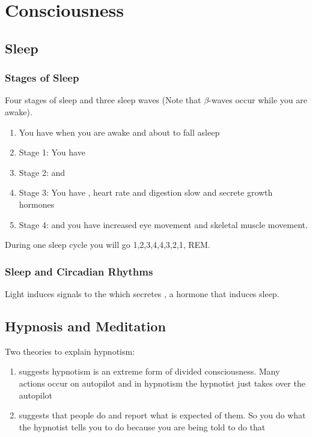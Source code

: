\documentclass[../Psych_Soci_review.tex]{subfiles}
\begin{document}
\section{Consciousness}
\subsection{Sleep}
\subsubsection{Stages of Sleep}
Four stages of sleep and three sleep waves (Note that $ \beta $-waves occur
while you are awake).
\begin{enumerate}
  \item You have when  you are awake and about to fall
    asleep  
  \item Stage 1: You have 
  \item Stage 2:  and 
  \item Stage 3: You have , heart rate and digestion slow
    and secrete growth hormones
  \item Stage 4:  and you have increased eye movement and
    skeletal muscle movement.
\end{enumerate}
During one sleep cycle you will go 1,2,3,4,4,3,2,1, REM. 

\subsubsection{Sleep and Circadian Rhythms}
Light induces signals to the  which secretes
, a hormone that induces sleep.

\subsection{Hypnosis and Meditation}
Two theories to explain hypnotism:
\begin{enumerate}
  \item {} suggests hypnotism is an extreme form of
    divided consciousness. Many actions occur on autopilot and in hypnotism the
    hypnotist just takes over the autopilot
  \item {} suggests that people do and report
    what is expected of them. So you do what the hypnotist tells you to do
    because you are being told to do that
\end{enumerate}
\end{document}
